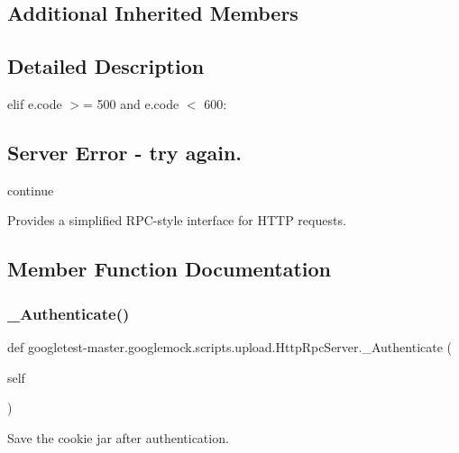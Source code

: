 \subsection*{Additional Inherited Members}


\subsection{Detailed Description}
elif e.\+code $>$= 500 and e.\+code $<$ 600\+: 

\subsection*{Server Error -\/ try again.}

continue \begin{DoxyVerb}Provides a simplified RPC-style interface for HTTP requests.\end{DoxyVerb}
 

\subsection{Member Function Documentation}
\mbox{\label{classgoogletest-master_1_1googlemock_1_1scripts_1_1upload_1_1_http_rpc_server_a1d68326ecc376f22a5509fd753498558}} 
\subsubsection{\texorpdfstring{\_Authenticate()}{\_Authenticate()}}
{\footnotesize\ttfamily def googletest-\/master.\+googlemock.\+scripts.\+upload.\+Http\+Rpc\+Server.\+\_\+\+Authenticate (\begin{DoxyParamCaption}\item[{}]{self }\end{DoxyParamCaption})\hspace{0.3cm}{\ttfamily [private]}}

\begin{DoxyVerb}Save the cookie jar after authentication.\end{DoxyVerb}
 

